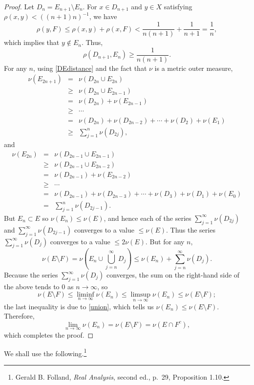 \documentclass{article}
\theoremstyle{definition}
\begin{document}
\begin{proof}
Let $D_n = E_{n+1} \setminus E_n$. For $x \in D_{n+1}$ and  $y \in X$ satisfying $\rho(x,y) < ((n+1)n)^{-1}$, we have
\[
\rho(y,F) \leq \rho(x,y) + \rho(x,F) < \frac{1}{n(n+1)} + \frac{1}{n+1} = \frac{1}{n},
\]
which implies that $y \not \in E_n$. Thus,
\begin{equation}
\rho(D_{n+1},E_n) \geq \frac{1}{n(n+1)}.
\label{DEdistance}
\end{equation}
For any $n$, using \eqref{DEdistance} and the fact that $\nu$ is a metric outer measure,
\begin{eqnarray*}
\nu(E_{2n+1})&=&\nu(D_{2n} \cup E_{2n})\\
&\geq&\nu(D_{2n} \cup E_{2n-1})\\
&=&\nu(D_{2n})+\nu(E_{2n-1})\\
&\geq&\cdots\\
&=&\nu(D_{2n})+\nu(D_{2n-2})+\cdots+\nu(D_2)+\nu(E_1)\\
&\geq&\sum_{j=1}^n \nu(D_{2j}),
\end{eqnarray*}
and
\begin{eqnarray*}
\nu(E_{2n})&=&\nu(D_{2n-1} \cup E_{2n-1})\\
&\geq&\nu(D_{2n-1} \cup E_{2n-2})\\
&=&\nu(D_{2n-1})+\nu(E_{2n-2})\\
&\geq&\cdots\\
&=&\nu(D_{2n-1})+\nu(D_{2n-3})+\cdots+\nu(D_3)+\nu(D_1)+\nu(E_0)\\
&=&\sum_{j=1}^n \nu(D_{2j-1}).
\end{eqnarray*}
But $E_n \subset E$ so $\nu(E_n) \leq \nu(E)$, and hence each of the series 
$\sum_{j=1}^\infty \nu(D_{2j})$ and $\sum_{j=1}^\infty \nu(D_{2j-1})$ converges to
a value $\leq \nu(E)$. Thus the series $\sum_{j=1}^\infty \nu(D_j)$ converges to a value $\leq 2\nu(E)$.
But for any $n$, 
\[
\nu(E \setminus F) = \nu\left( E_n \cup \bigcup_{j=n}^\infty D_j \right)
\leq \nu(E_n) + \sum_{j=n}^\infty \nu(D_j).
\]
Because the series $\sum_{j=1}^\infty \nu(D_j)$ converges, the sum on the right-hand side of the above
tends to $0$ as $n \to \infty$, so
\[
\nu(E \setminus F) \leq \liminf_{n \to \infty} \nu(E_n) \leq \limsup_{n \to \infty} \nu(E_n) \leq  \nu(E \setminus F);
\]
the last inequality is due to \eqref{union}, which tells us $\nu(E_n) \leq \nu(E \setminus F)$.
Therefore, 
\[
\lim_{n \to \infty} \nu(E_n) = \nu(E \setminus F) = \nu(E \cap F^c),
\]
which completes the proof.
\end{proof}


We shall use the following.\footnote{Gerald B. Folland, {\em Real Analysis}, second ed., p.~29, Proposition 1.10.}
\end{document}
